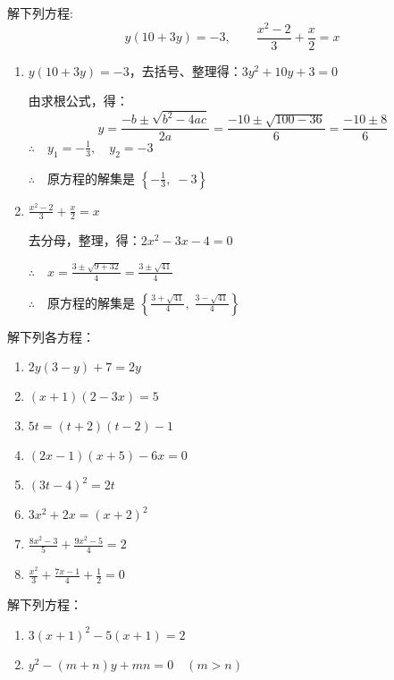 \begin{example}
   解下列方程: 
$$y(10+3 y)=-3,\qquad \frac{x^{2}-2}{3}+\frac{x}{2}=x$$
\end{example}



\begin{solution}
\begin{enumerate}
    \item $y(10+3 y)=-3$，去括号、整理得：$3y^2+10y+3=0$

    由求根公式，得：
\[y=\frac{-b\pm\sqrt{b^2-4ac}}{2a}=\frac{-10\pm\sqrt{100-36}}{6}=\frac{-10\pm 8}{6}\]
$\therefore\quad y_1=-\frac{1}{3},\quad y_2=-3$

$\therefore\quad$原方程的解集是 $\left\{-\frac{1}{3},\; -3\right\}$

\item $\frac{x^{2}-2}{3}+\frac{x}{2}=x$

去分母，整理，得：$2x^2-3x-4=0$

$\therefore\quad x=\frac{3\pm\sqrt{9+32}}{4}=\frac{3\pm\sqrt{41}}{4} $

$\therefore\quad$原方程的解集是 $\left\{\frac{3+\sqrt{41}}{4} ,\; \frac{3-\sqrt{41}}{4} \right\}$
\end{enumerate}
\end{solution}

\begin{ex}
    解下列各方程：
    \begin{multicols}{2}
\begin{enumerate}
    \item  $2 y(3-y)+7=2 y$
    \item  $(x+1)(2-3 x)=5$
    \item  $5 t=(t+2)(t-2)-1$
    \item  $(2 x-1)(x+5)-6 x=0$
    \item  $(3 t-4)^{2}=2 t$
    \item  $3 x^{2}+2 x=(x+2)^{2}$
    \item  $\frac{8 x^{2}-3}{5}+\frac{9 x^{2}-5}{4}=2$
    \item $\frac{x^{2}}{3}+\frac{7 x-1}{4}+\frac{1}{2}=0$
\end{enumerate}        
    \end{multicols}
\end{ex}




\begin{example}
    解下列方程：
\begin{enumerate}
    \item $3(x+1)^2-5(x+1)=2$
    \item $y^2-(m+n)y+mn=0\quad (m>n)$
\end{enumerate}
\end{example}

